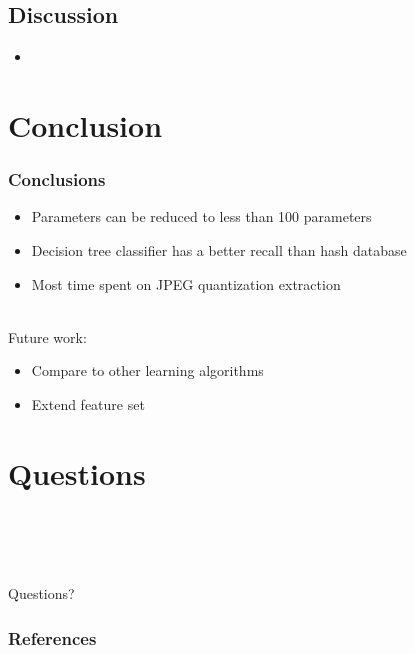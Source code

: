 \documentclass{beamer}
\begin{document}
\subsection{Discussion}
\begin{frame}
\begin{itemize}
\item 
\end{itemize}
\end{frame}


\section{Conclusion}
\begin{frame}
\frametitle{Conclusions}
\begin{itemize}
\item Parameters can be reduced to less than 100 parameters
\item Decision tree classifier has a better recall than hash database
\item Most time spent on JPEG quantization extraction
\end{itemize}
~\\Future work:
\begin{itemize}
\item Compare to other learning algorithms
\item Extend feature set
\end{itemize}
\end{frame}

\section[Questions]{Questions}
\begin{frame}
~ \\~ \\~ \\
\begin{center}\Huge Questions? \end{center} 
\end{frame}

\begin{frame}[allowframebreaks]
        \frametitle{References}
        
        
\end{frame}
\end{document}
